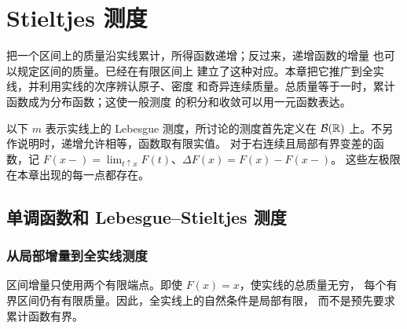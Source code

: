 \chapter{Stieltjes 测度}
\label{chap:stieltjes-measures}

把一个区间上的质量沿实线累计，所得函数递增；反过来，递增函数的增量
也可以规定区间的质量。已经在有限区间上
建立了这种对应。本章把它推广到全实线，并利用实线的次序辨认原子、密度
和奇异连续质量。总质量等于一时，累计函数成为分布函数；这使一般测度
的积分和收敛可以用一元函数表达。

以下 \(m\) 表示实线上的 Lebesgue 测度，所讨论的测度首先定义在
\(\mathcal B(\mathbb{R})\) 上。不另作说明时，递增允许相等，函数取有限实值。
对于右连续且局部有界变差的函数，记
\(F(x-)=\lim_{t\uparrow x}F(t)\)、\(\Delta F(x)=F(x)-F(x-)\)。
这些左极限在本章出现的每一点都存在。

\section{单调函数和 Lebesgue--Stieltjes 测度}
\label{sec:stieltjes-line-construction}

\subsection{从局部增量到全实线测度}

区间增量只使用两个有限端点。即使 \(F(x)=x\)，使实线的总质量无穷，
每个有界区间仍有有限质量。因此，全实线上的自然条件是局部有限，
而不是预先要求累计函数有界。

